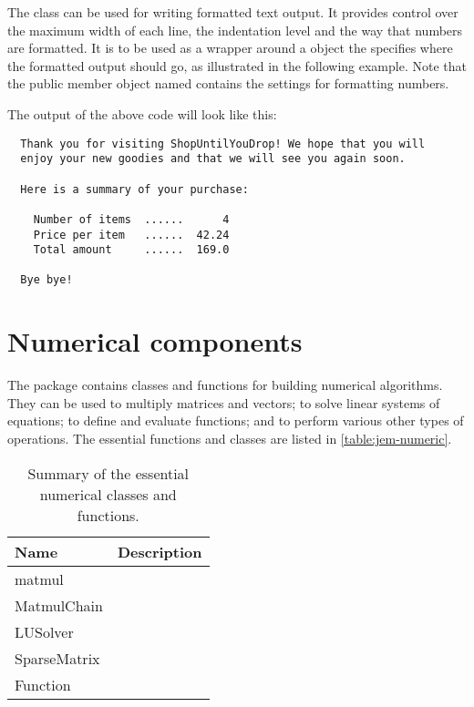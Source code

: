 The class  can be used for writing formatted text
output. It provides control over the maximum width of each line, the
indentation level and the way that numbers are formatted. It is to be
used as a wrapper around a  object the specifies where the
formatted output should go, as illustrated in the following example. Note
that the public member object named  contains the settings
for formatting numbers.


The output of the above code will look like this:

\begin{Verbatim}
  Thank you for visiting ShopUntilYouDrop! We hope that you will
  enjoy your new goodies and that we will see you again soon.

  Here is a summary of your purchase:

    Number of items  ......      4
    Price per item   ......  42.24
    Total amount     ......  169.0

  Bye bye!
\end{Verbatim}


\section{Numerical components}

The  package contains classes and functions for building
numerical algorithms. They can be used to multiply matrices and vectors;
to solve linear systems of equations; to define and evaluate functions;
and to perform various other types of operations. The essential functions
and classes are listed in \autoref{table:jem-numeric}.

\begin{table}

  \caption{Summary of the essential numerical classes and functions.}
  \label{table:jem-numeric}

  \begin{center}

    \begin{tabular}{|>{\ttfamily}lp{10cm}|}
      \hline
      Name         & Description \\
      \hline \hline
      matmul       & \\
      MatmulChain  & \\
      LUSolver     & \\
      SparseMatrix & \\
      Function     & \\
      \hline
    \end{tabular}

  \end{center}

\end{table}


